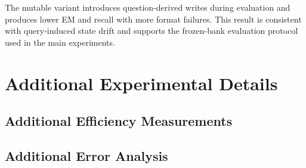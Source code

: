 \documentclass[letterpaper]{article}
\begin{document}
The mutable variant introduces question-derived writes during evaluation
and produces lower EM and recall with more format failures. This result is
consistent with query-induced state drift and supports the frozen-bank
evaluation protocol used in the main experiments.



\section{Additional Experimental Details}
\label{sec:supp-analysis}


\subsection{Additional Efficiency Measurements}



\subsection{Additional Error Analysis}

\end{document}
